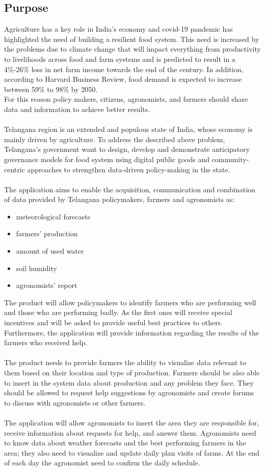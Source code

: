 \subsection{Purpose} 
Agriculture has a key role in India's economy and covid-19 pandemic has highlighted the need of building a resilient food system.
This need is increased by the problems due to climate change that will impact everything from productivity to 
livelihoods across food and farm systems and is predicted to result in a 4\%-26\% loss in net farm income towards the end of the century.
In addition, according to Harvard Business Review, food demand is expected to increase between 59\% to 98\% by 2050.\\
For this reason policy makers, citizens, agronomists, and farmers should share data and information to achieve better results. 
\\\\
Telangana region is an extended and populous state of India, whose economy is mainly driven by agriculture. 
To address the described above problem, Telangana's government want to design, 
develop and demonstrate anticipatory governance models for food system using digital 
public goods and community-centric approaches to strengthen data-driven policy-making in the state.
\\\\
The application aims to enable the acquisition, communication and combination of data provided by Telangana policymakers, 
farmers and agronomists as:
\begin{itemize}
    \item meteorological forecasts
    \item farmers' production
    \item amount of used water
    \item soil humidity
    \item agronomists' report
\end{itemize}
\bigskip
The product will allow policymakers to identify farmers who are performing well and those who are performing badly. 
As the first ones will receive special incentives and will be asked to provide useful best practices to others. 
Furthermore, the application will provide information regarding the results of the farmers who received help.
\\\\
The product needs to provide farmers the ability to visualize data relevant to them based on their location and type of production. 
Farmers should be also able to insert in the system data about production and any problem they face. 
They should be allowed to request help suggestions by agronomists and create forums to discuss with agronomists or other farmers.
\\\\
The application will allow agronomists to insert the area they are responsible for, receive information about requests for help, 
and answer them. Agronomists need to know data about weather forecasts and the best performing farmers in the area; 
they also need to visualize and update daily plan visits of farms. At the end of each day the agronomist need to confirm the daily
schedule.


